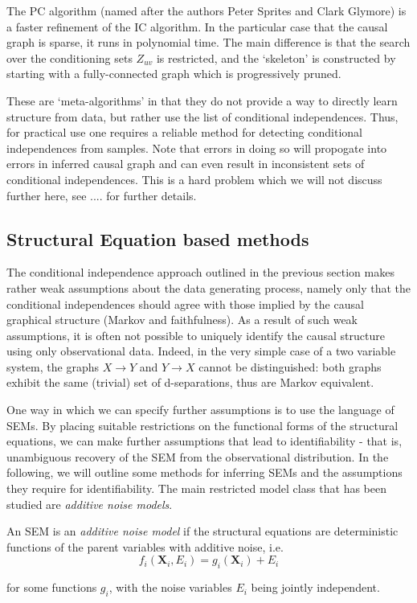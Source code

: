 The PC algorithm (named after the authors Peter Sprites and Clark Glymore) is a faster refinement of the IC algorithm. In the particular case that the causal graph is sparse, it runs in polynomial time. The main difference is that the search over the conditioning sets $Z_{uv}$ is restricted, and the `skeleton'  is constructed by starting with a fully-connected graph which is progressively pruned.  

These are `meta-algorithms' in that they do not provide a way to directly learn structure from data, but rather use the list of conditional independences.  
Thus, for practical use one requires a reliable method for detecting conditional independences from samples.
Note that errors in doing so will propogate into errors in inferred causal graph and can even result in inconsistent sets of conditional independences. 
This is a hard problem which we will not discuss further here, see .... for further details.

\subsection{Structural Equation based methods}

The conditional independence approach outlined in the previous section makes rather weak assumptions about the data generating process, namely only that the conditional independences should agree with those implied by the causal graphical structure (Markov and faithfulness). 
As a result of such weak assumptions, it is often not possible to uniquely identify the causal structure using only observational data. 
Indeed, in the very simple case of a two variable system, the graphs $X \rightarrow Y$ and $Y \rightarrow X$ cannot be distinguished:
both graphs exhibit the same (trivial) set of d-separations, thus are Markov equivalent. 

One way in which we can specify further assumptions is to use the language of SEMs. 
By placing suitable restrictions on the functional forms of the structural equations, we can make further assumptions that lead to identifiability - that is, unambiguous recovery of the SEM from the observational distribution. In the following, we will outline some methods for inferring SEMs and the assumptions they require for identifiability. 
The main restricted model class that has been studied are \emph{additive noise models}.

\begin{definition}
	An SEM is an \emph{additive noise model} if the structural equations are deterministic functions of the parent variables with additive noise, i.e.
	\[f_i(\mathbf{X}_i,E_i) = g_i(\mathbf{X}_i) + E_i \]
	
	for some functions $g_i$, with the noise variables $E_i$ being jointly independent.
\end{definition}

